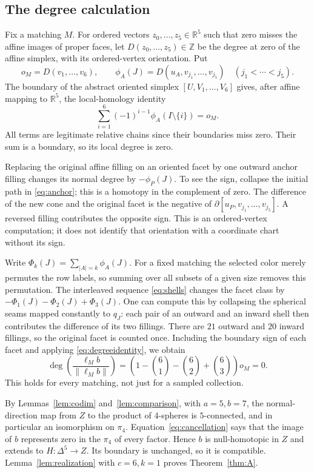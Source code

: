 \documentclass[a4paper,11pt,reqno]{amsart}
\newcommand{\R}{\mathbb R}
\newcommand{\Z}{\mathbb Z}
\theoremstyle{definition}
\theoremstyle{remark}
\numberwithin{equation}{section}
\begin{document}
\subsection{The degree calculation}
Fix a matching $M$. For ordered vectors $z_0,\ldots,z_5\in\R^5$ such
that zero misses the affine images of proper faces, let
$D(z_0,\ldots,z_5)\in\Z$ be the degree at zero of the affine simplex,
with its ordered-vertex orientation. Put
\[
 o_M=D(v_1,\ldots,v_6),\qquad
 \phi_A(J)=D(u_A,v_{j_1},\ldots,v_{j_5})
 \quad(j_1<\cdots<j_5).
\]
The boundary of the abstract oriented simplex $[U,V_1,\ldots,V_6]$
gives, after affine mapping to $\R^5$, the local-homology identity
\begin{equation}\label{eq:degreeidentity}
 \sum_{i=1}^6(-1)^{i-1}\phi_A(I\setminus\{i\})=o_M.
\end{equation}
All terms are legitimate relative chains since their boundaries miss
zero. Their sum is a boundary, so its local degree is zero.

Replacing the original affine filling on an oriented facet by one
outward anchor filling changes its normal degree by $-\phi_P(J)$.
To see the sign, collapse the initial path in \eqref{eq:anchor}; this
is a homotopy in the complement of zero. The difference of the new
cone and the original facet is the negative of
$\partial[u_P,v_{j_1},\ldots,v_{j_5}]$. A reversed filling contributes
the opposite sign. This is an ordered-vertex computation; it does
not identify that orientation with a coordinate chart without its sign.

Write $\Phi_k(J)=\sum_{|A|=k}\phi_A(J)$. For a fixed matching the
selected color merely permutes the row labels, so summing over all
subsets of a given size removes this permutation. The interleaved
sequence \eqref{eq:shells} changes the facet class by
$-\Phi_1(J)-\Phi_2(J)+\Phi_3(J)$. One can compute this by collapsing
the spherical seams mapped constantly to $q_J$: each pair of an outward
and an inward shell then contributes the difference of its two fillings. There are $21$ outward and $20$
inward fillings, so the original facet is counted once. Including the
boundary sign of each facet and applying \eqref{eq:degreeidentity},
we obtain
\begin{equation}\label{eq:cancellation}
 \deg\left(\frac{\ell_M b}{\|\ell_M b\|}\right)
 =\left(1-\binom61-\binom62+\binom63\right)o_M=0.
\end{equation}
This holds for every matching, not just for a sampled collection.

By Lemmas~\ref{lem:codim} and~\ref{lem:comparison}, with $a=5,b=7$,
the normal-direction map from $Z$ to the product of $4$-spheres is
$5$-connected, and in particular an isomorphism on $\pi_4$.
Equation~\eqref{eq:cancellation} says that the image of $b$ represents
zero in the $\pi_4$ of every factor. Hence $b$ is null-homotopic in $Z$
and extends to $H:\Delta^5\to Z$. Its boundary is unchanged, so it
is compatible. Lemma~\ref{lem:realization} with $c=6,k=1$ proves
Theorem~\ref{thm:A}.
\end{document}
